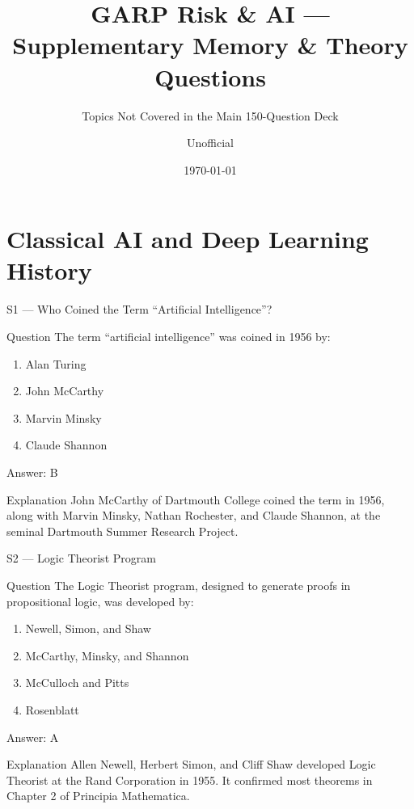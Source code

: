 \documentclass[aspectratio=169,8pt]{beamer}
\title[GARP RAI]{GARP Risk \& AI --- Supplementary Memory \& Theory Questions}
\subtitle{Topics Not Covered in the Main 150-Question Deck}
\author{Unofficial}
\date{\today}
\begin{document}
	
	\begin{frame}
		\titlepage
	\end{frame}
	
	\section{Classical AI and Deep Learning History}
	
	\begin{frame}{S1 --- Who Coined the Term ``Artificial Intelligence''?}
		\begin{block}{Question}
			The term ``artificial intelligence'' was coined in 1956 by:
			\begin{enumerate}
				\item Alan Turing
				\item John McCarthy
				\item Marvin Minsky
				\item Claude Shannon
			\end{enumerate}
		\end{block}
		\begin{exampleblock}{Answer: B}\end{exampleblock}
		\begin{block}{Explanation}
			John McCarthy of Dartmouth College coined the term in 1956, along with Marvin Minsky, Nathan Rochester, and Claude Shannon, at the seminal Dartmouth Summer Research Project.
		\end{block}
	\end{frame}
	
	\begin{frame}{S2 --- Logic Theorist Program}
		\begin{block}{Question}
			The Logic Theorist program, designed to generate proofs in propositional logic, was developed by:
			\begin{enumerate}
				\item Newell, Simon, and Shaw
				\item McCarthy, Minsky, and Shannon
				\item McCulloch and Pitts
				\item Rosenblatt
			\end{enumerate}
		\end{block}
		\begin{exampleblock}{Answer: A}\end{exampleblock}
		\begin{block}{Explanation}
			Allen Newell, Herbert Simon, and Cliff Shaw developed Logic Theorist at the Rand Corporation in 1955. It confirmed most theorems in Chapter 2 of Principia Mathematica.
		\end{block}
	\end{frame}
	
\end{document}
